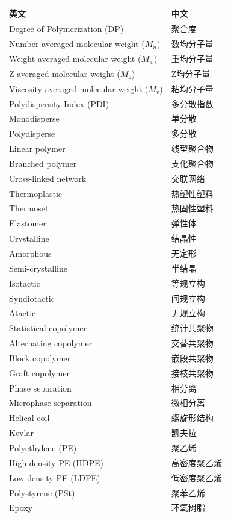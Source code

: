 \documentclass[12pt,a4paper]{ctexart}
\begin{document}
\begin{longtable}{p{5cm}p{5cm}}
\toprule
\textbf{英文} & \textbf{中文} \\
\midrule
Degree of Polymerization (DP) & 聚合度 \\
Number-averaged molecular weight ($M_n$) & 数均分子量 \\
Weight-averaged molecular weight ($M_w$) & 重均分子量 \\
Z-averaged molecular weight ($M_z$) & Z均分子量 \\
Viscosity-averaged molecular weight ($M_v$) & 粘均分子量 \\
Polydispersity Index (PDI) & 多分散指数 \\
Monodisperse & 单分散 \\
Polydisperse & 多分散 \\
Linear polymer & 线型聚合物 \\
Branched polymer & 支化聚合物 \\
Cross-linked network & 交联网络 \\
Thermoplastic & 热塑性塑料 \\
Thermoset & 热固性塑料 \\
Elastomer & 弹性体 \\
Crystalline & 结晶性 \\
Amorphous & 无定形 \\
Semi-crystalline & 半结晶 \\
Isotactic & 等规立构 \\
Syndiotactic & 间规立构 \\
Atactic & 无规立构 \\
Statistical copolymer & 统计共聚物 \\
Alternating copolymer & 交替共聚物 \\
Block copolymer & 嵌段共聚物 \\
Graft copolymer & 接枝共聚物 \\
Phase separation & 相分离 \\
Microphase separation & 微相分离 \\
Helical coil & 螺旋形结构 \\
Kevlar & 凯夫拉 \\
Polyethylene (PE) & 聚乙烯 \\
High-density PE (HDPE) & 高密度聚乙烯 \\
Low-density PE (LDPE) & 低密度聚乙烯 \\
Polystyrene (PSt) & 聚苯乙烯 \\
Epoxy & 环氧树脂 \\
\bottomrule
\end{longtable}
\end{document}
